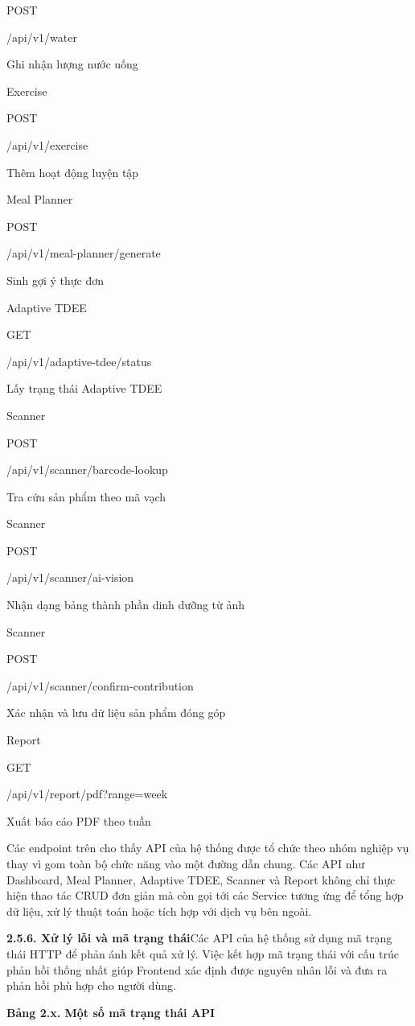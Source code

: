 POST

/api/v1/water

Ghi nhận lượng nước uống

Exercise

POST

/api/v1/exercise

Thêm hoạt động luyện tập

Meal Planner

POST

/api/v1/meal-planner/generate

Sinh gợi ý thực đơn

Adaptive TDEE

GET

/api/v1/adaptive-tdee/status

Lấy trạng thái Adaptive TDEE

Scanner

POST

/api/v1/scanner/barcode-lookup

Tra cứu sản phẩm theo mã vạch

Scanner

POST

/api/v1/scanner/ai-vision

Nhận dạng bảng thành phần dinh dưỡng từ ảnh

Scanner

POST

/api/v1/scanner/confirm-contribution

Xác nhận và lưu dữ liệu sản phẩm đóng góp

Report

GET

/api/v1/report/pdf?range=week

Xuất báo cáo PDF theo tuần

Các endpoint trên cho thấy API của hệ thống được tổ chức theo nhóm nghiệp vụ thay vì gom toàn bộ chức năng vào một đường dẫn chung. Các API như Dashboard, Meal Planner, Adaptive TDEE, Scanner và Report không chỉ thực hiện thao tác CRUD đơn giản mà còn gọi tới các Service tương ứng để tổng hợp dữ liệu, xử lý thuật toán hoặc tích hợp với dịch vụ bên ngoài.

\textbf{2.5.6. Xử lý lỗi và mã trạng thái}Các API của hệ thống sử dụng mã trạng thái HTTP để phản ánh kết quả xử lý. Việc kết hợp mã trạng thái với cấu trúc phản hồi thống nhất giúp Frontend xác định được nguyên nhân lỗi và đưa ra phản hồi phù hợp cho người dùng.

\textbf{Bảng 2.x. Một số mã trạng thái API}

